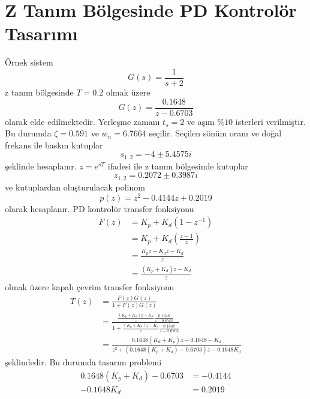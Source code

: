 \chapter{Z Tanım Bölgesinde PD Kontrolör Tasarımı}
Örnek sistem
\begin{equation}
    G(s)=\frac{1}{s+2}
\end{equation}
z tanım bölgesinde $T=0.2$ olmak üzere
\begin{equation}
    G(z)=\frac{0.1648}{z-0.6703}
\end{equation}
olarak elde edilmektedir. Yerleşme zamanı $t_s=2$ ve aşım $\%10$ isterleri verilmiştir. Bu durumda $\zeta=0.591$ ve $w_n=6.7664$ seçilir. Seçilen sönüm oranı ve doğal frekans ile baskın kutuplar
\begin{equation}
    s_{1,2}=-4 \pm 5.4575i
\end{equation}
şeklinde hesaplanır. $z=e^{sT}$ ifadesi ile z tanım bölgesinde kutuplar
\begin{equation}
    z_{1,2}=0.2072 \pm 0.3987i
\end{equation}
ve kutuplardan oluşturulacak polinom
\begin{equation}
    p(z)=z^2-0.4144 z+0.2019
\end{equation}
olarak hesaplanır. PD kontrolör transfer fonksiyonu
\begin{equation}
\begin{split}
    F(z)&=K_p+K_d(1-z^{-1})\\
    &=K_p+K_d(\frac{z-1}{z})\\
    &=\frac{K_pz+K_dz-K_d}{z}\\
    &=\frac{(K_p+K_d)z-K_d}{z}
\end{split}
\end{equation}
olmak üzere kapalı çevrim transfer fonksiyonu
\begin{equation}
    \begin{split}
        T(z)&=\frac{F(z)G(z)}{1+F(z)G(z)}\\
        &=\frac{\frac{(K_p+K_d)z-K_d}{z}\frac{0.1648}{z-0.6703}}{1+\frac{(K_p+K_d)z-K_d}{z}\frac{0.1648}{z-0.6703}}\\
        &=\frac{0.1648(K_d+K_p)z-0.1648-K_d}{z^2+(0.1648(K_p+K_d)-0.6703)z-0.1648K_d}
    \end{split}
\end{equation}
şeklindedir. Bu durumda tasarım problemi
\begin{equation}
    \begin{split}
        0.1648(K_p+K_d)-0.6703&=-0.4144\\
        -0.1648K_d&=0.2019
    \end{split}
\end{equation}

